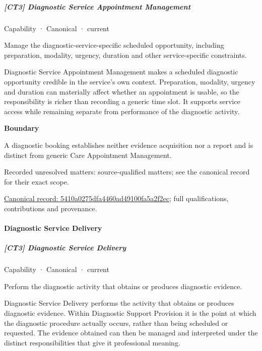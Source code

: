 \subparagraph{[CT3] Diagnostic Service Appointment Management}

\label{element:5410a0275dfa4460ad49100fa5a2f2ec}
{\small Capability · Canonical · current}\par

Manage the diagnostic-service-specific scheduled opportunity, including preparation, modality, urgency, duration and other service-specific constraints.



Diagnostic Service Appointment Management makes a scheduled diagnostic opportunity credible in the service's own context. Preparation, modality, urgency and duration can materially affect whether an appointment is usable, so the responsibility is richer than recording a generic time slot. It supports service access while remaining separate from performance of the diagnostic activity.



\textbf{Boundary}



A diagnostic booking establishes neither evidence acquisition nor a report and is distinct from generic Care Appointment Management.


{\small Recorded unresolved matters: source-qualified matters; see the canonical record for their exact scope.}\par
{\footnotesize \href{../../../../continuum/strategy/capability/5410a0275dfa4460ad49100fa5a2f2ec.md}{Canonical record: 5410a0275dfa4460ad49100fa5a2f2ec}; full qualifications, contributions and provenance.}\par
\paragraph{Diagnostic Service Delivery}

\subparagraph{[CT3] Diagnostic Service Delivery}

\label{element:7a1ae953164d456c93637f8e35b4940e}
{\small Capability · Canonical · current}\par

Perform the diagnostic activity that obtains or produces diagnostic evidence.



Diagnostic Service Delivery performs the activity that obtains or produces diagnostic evidence. Within Diagnostic Support Provision it is the point at which the diagnostic procedure actually occurs, rather than being scheduled or requested. The evidence obtained can then be managed and interpreted under the distinct responsibilities that give it professional meaning.




